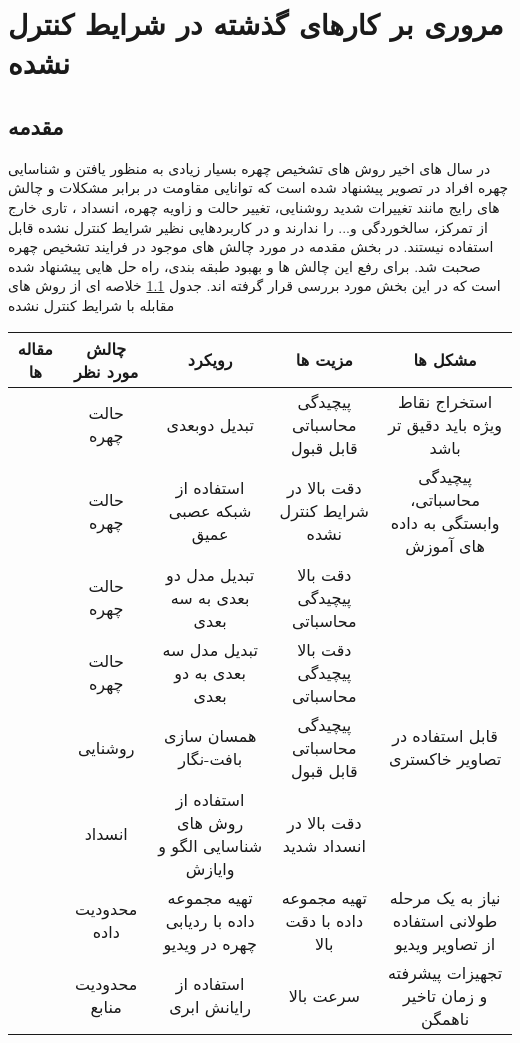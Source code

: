 \chapter{مروری بر کارهای گذشته در شرایط کنترل نشده}
\section{مقدمه}
در سال های اخیر روش های تشخیص چهره بسیار زیادی به منظور یافتن و شناسایی چهره افراد در تصویر پیشنهاد شده است که توانایی مقاومت در برابر مشکلات و چالش های رایج مانند تغییرات شدید روشنایی، تغییر حالت و زاویه چهره، انسداد ، تاری خارج از تمرکز، سالخوردگی و... را ندارند و در کاربردهایی نظیر شرایط کنترل نشده قابل استفاده نیستند. در بخش مقدمه در مورد چالش های موجود در فرایند تشخیص چهره صحبت شد. برای رفع این چالش ها و بهبود طبقه بندی، راه حل هایی پیشنهاد شده است که در این بخش مورد بررسی قرار گرفته اند.
جدول \ref{table:3-1} خلاصه ای از روش های مقابله با شرایط کنترل نشده

\begin{table}[ht]
\label{table:3-1}
\begin{center}
\resizebox{\textwidth}{!}
{
\begin{tabular}{|c|c|c|c|c|}
\hline 
مقاله ها & چالش مورد نظر & رویکرد & مزیت ها & مشکل ها
\\
\hline 
\cite{HAGHIGHAT201623, LV2016465, amos2016openface, 6196234}
& حالت چهره	 & تبدیل دوبعدی & 	پیچیدگی محاسباتی قابل قبول & 	استخراج نقاط ویژه باید دقیق تر باشد
 \\
\hline
\cite{wu2016facial, 7477555, 7780892, 7532959, 7298667}
 & حالت چهره & 	استفاده از شبکه عصبی عمیق & دقت بالا در شرایط کنترل نشده & 	پیچیدگی محاسباتی، وابستگی به داده های آموزش 
\\
\hline
\cite{HU2017366, hassner2014effective, 7298679, 7006757, 6905796}
 & حالت چهره & 	تبدیل مدل دو بعدی به سه بعدی & 	دقت بالا 	پیچیدگی محاسباتی &
\\
\hline 
\cite{DING2017144}
& حالت چهره & 	تبدیل مدل سه بعدی به دو بعدی & 	دقت بالا 	پیچیدگی محاسباتی &
\\
\hline
\cite{6196234, HUSSAINSHAH201597}
 & روشنایی	 & همسان سازی بافت-نگار & 	پیچیدگی محاسباتی قابل قبول & 	قابل استفاده در تصاویر خاکستری
\\
\hline
\cite{7015448, WU2018256}
 & انسداد	 & استفاده از روش های شناسایی الگو و وایازش & 	دقت بالا در انسداد شدید &	
\\
\hline
\cite{7984553}
 & محدودیت داده	 & تهیه مجموعه داده با ردیابی چهره در ویدیو & 	تهیه مجموعه داده با دقت بالا & 	نیاز به یک مرحله طولانی استفاده از تصاویر ویدیو
\\
\hline
\cite{6249269, HU2018582}
 & محدودیت منابع & 	استفاده از رایانش ابری & 	سرعت بالا & 	تجهیزات پیشرفته و زمان تاخیر ناهمگن
\\
\hline
\end{tabular}}
\end{center} 
\end{table} 

